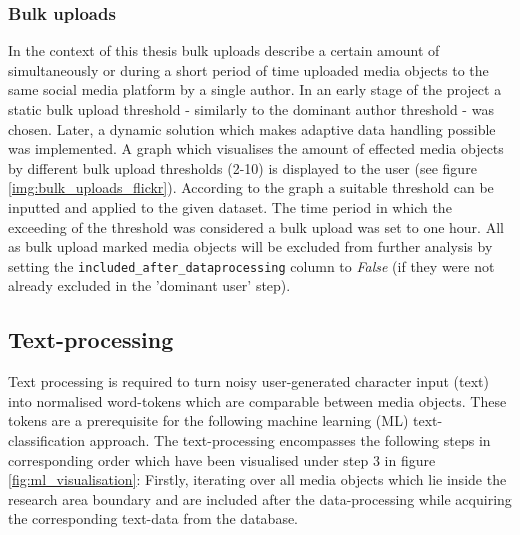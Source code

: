 \subsubsection*{Bulk uploads} \label{bias_bulk_uploads}
In the context of this thesis bulk uploads describe a certain amount of simultaneously or during a short period of time uploaded media objects to the same social media platform by a single author. In an early stage of the project a static bulk upload threshold - similarly to the dominant author threshold - was chosen. Later, a dynamic solution which makes adaptive data handling possible was implemented. A graph which visualises the amount of effected media objects by different bulk upload thresholds (2-10) is displayed to the user (see figure \ref{img:bulk_uploads_flickr}). According to the graph a suitable threshold can be inputted and applied to the given dataset. The time period in which the exceeding of the threshold was considered a bulk upload was set to one hour. 
All as bulk upload marked media objects will be excluded from further analysis by setting the \texttt{included\_after\_dataprocessing} column to \textit{False} (if they were not already excluded in the 'dominant user' step).

\subsection{Text-processing} \label{text_processing}
Text processing is required to turn noisy user-generated character input (text) into normalised word-tokens which are comparable between media objects. These tokens are a prerequisite for the following machine learning (ML) text-classification approach. The text-processing encompasses the following steps in corresponding order which have been visualised under step 3 in figure \ref{fig:ml_visualisation}: Firstly, iterating over all media objects which lie inside the research area boundary and are included after the data-processing while acquiring the corresponding text-data from the database.

